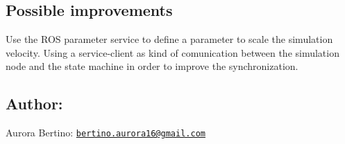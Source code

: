 \subsection*{Possible improvements}

Use the R\+OS parameter service to define a parameter to scale the simulation velocity. Using a service-\/client as kind of comunication between the simulation node and the state machine in order to improve the synchronization.

\subsection*{Author\+:}


\begin{DoxyItemize}
\item Aurora Bertino\+: \href{mailto:bertino.aurora16@gmail.com}{\tt bertino.\+aurora16@gmail.\+com} 
\end{DoxyItemize}